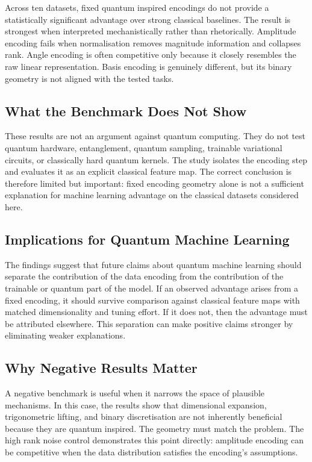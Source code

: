 \documentclass[12pt]{article}
\begin{document}
Across ten datasets, fixed quantum inspired encodings do not provide a
statistically significant advantage over strong classical baselines. The result
is strongest when interpreted mechanistically rather than rhetorically.
Amplitude encoding fails when normalisation removes magnitude information and
collapses rank. Angle encoding is often competitive only because it closely
resembles the raw linear representation. Basis encoding is genuinely different,
but its binary geometry is not aligned with the tested tasks.

\subsection{What the Benchmark Does Not Show}

These results are not an argument against quantum computing. They do not test
quantum hardware, entanglement, quantum sampling, trainable variational circuits,
or classically hard quantum kernels. The study isolates the encoding step and
evaluates it as an explicit classical feature map. The correct conclusion is
therefore limited but important: fixed encoding geometry alone is not a
sufficient explanation for machine learning advantage on the classical datasets
considered here.

\subsection{Implications for Quantum Machine Learning}

The findings suggest that future claims about quantum machine learning should
separate the contribution of the data encoding from the contribution of the
trainable or quantum part of the model. If an observed advantage arises from a
fixed encoding, it should survive comparison against classical feature maps with
matched dimensionality and tuning effort. If it does not, then the advantage
must be attributed elsewhere. This separation can make positive claims stronger
by eliminating weaker explanations.

\subsection{Why Negative Results Matter}

A negative benchmark is useful when it narrows the space of plausible
mechanisms. In this case, the results show that dimensional expansion,
trigonometric lifting, and binary discretisation are not inherently beneficial
because they are quantum inspired. The geometry must match the problem. The high
rank noise control demonstrates this point directly: amplitude encoding can be
competitive when the data distribution satisfies the encoding's assumptions.
\end{document}
